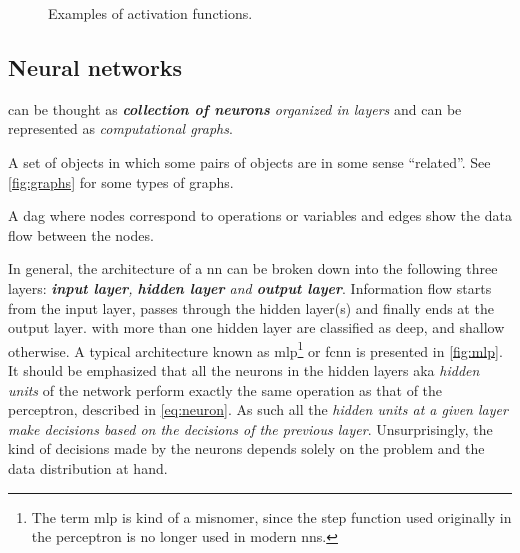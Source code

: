 \begin{figure}
	\centering
	\caption{Examples of activation functions.}
	\label{fig:activation_functions}
\end{figure}

\subsection{Neural networks}
\label{subsec:nn}

 can be thought as \emph{\textbf{collection of neurons} organized
in layers} and can be represented as \emph{computational
graphs}.

\begin{definition}[Graph]
	A set of objects in which some pairs of objects are in some sense
	``related''. See \Figure{} \ref{fig:graphs} for some types of graphs.
\end{definition}

\begin{definition}
	A \gls{dag} where nodes correspond to operations or variables and edges show
	the data flow between the nodes.
\end{definition}

\noindent In general, the architecture of a
\gls{nn} can be broken down into the following three layers: \emph{\textbf{input
layer}, \textbf{hidden layer} and
\textbf{output layer}}. Information flow starts from the
input layer, passes through the hidden layer(s) and finally ends at the output
layer.  with more than one hidden layer are classified as deep, and
shallow otherwise. A typical architecture known as \gls{mlp}\footnote{The term \gls{mlp} is kind of a misnomer, since the step
function used originally in the perceptron is no longer used in modern
\glspl{nn}.} or \gls{fcnn} is presented in
\Figure{} \ref{fig:mlp}. It should be emphasized that all the neurons in the hidden
layers aka \emph{hidden units} of the network perform exactly
the same operation as that of the perceptron, described in \Equation{}
\ref{eq:neuron}. As such all the \emph{hidden units at a given layer make
decisions based on the decisions of the previous layer}. Unsurprisingly, the
kind of decisions made by the neurons depends solely on the problem and the data
distribution at hand.

